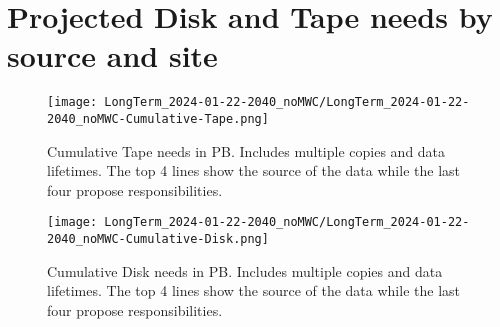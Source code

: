 \section{Projected Disk and Tape needs by source and site}
\begin{figure}[h]
\centering\texttt{[image: LongTerm\_2024-01-22-2040\_noMWC/LongTerm\_2024-01-22-2040\_noMWC-Cumulative-Tape.png]}
\caption{Cumulative Tape needs in PB. Includes multiple copies and data lifetimes. The top 4 lines show the source of the data while the last four propose responsibilities.}
\label{fig:Cumulative-Tape}
\end{figure}
\begin{figure}[h]
\centering\texttt{[image: LongTerm\_2024-01-22-2040\_noMWC/LongTerm\_2024-01-22-2040\_noMWC-Cumulative-Disk.png]}
\caption{Cumulative Disk needs in PB. Includes multiple copies and data lifetimes. The top 4 lines show the source of the data while the last four propose responsibilities.}
\label{fig:Cumulative-Disk}
\end{figure}
